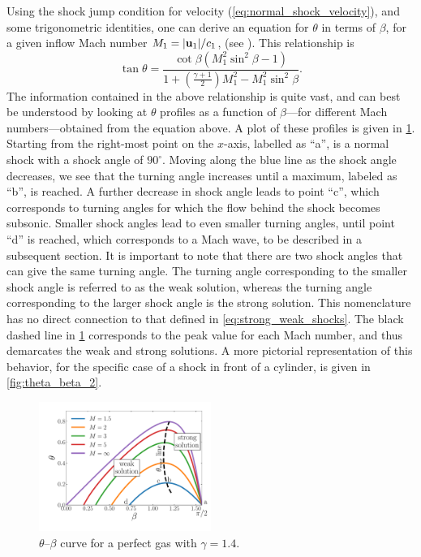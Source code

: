 \documentclass[oneside,a4paper,11pt]{report}
\begin{document}
Using the shock jump condition for velocity (\cref{eq:normal_shock_velocity}), and some trigonometric identities, one can derive an equation for $\theta$ in terms of $\beta$, for a given inflow Mach number $M_1 = |\mathbf{u}_1|/c_1$, (see \cite{thompson1988}). This relationship is
\begin{equation}
    \tan \theta =\dfrac{ \cot \beta \left ( M_1^2 \sin^2 \beta - 1 \right ) }{ 1 + \left ( \frac{\gamma + 1}{2} \right ) M_1^2 - M_1^2 \sin^2 \beta}.
\end{equation}
The information contained in the above relationship is quite vast, and can best be understood by looking at $\theta$ profiles as a function of $\beta$---for different Mach numbers---obtained from the equation above. A plot of these profiles is given in \cref{fig:theta_beta_1}. Starting from the right-most point on the $x$-axis, labelled as ``a'', is a normal shock with a shock angle of $90^\circ$. Moving along the blue line as the shock angle decreases, we see that the turning angle increases until a maximum, labeled as ``b'', is reached. A further decrease in shock angle leads to point ``c'', which corresponds to turning angles for which the flow behind the shock becomes subsonic. Smaller shock angles lead to even smaller turning angles, until point ``d'' is reached, which corresponds to a Mach wave, to be described in a subsequent section. It is important to note that there are two shock angles that can give the same turning angle. The turning angle corresponding to the smaller shock angle is referred to as the weak solution, whereas the turning angle corresponding to the larger shock angle is the strong solution. This nomenclature has no direct connection to that defined in \cref{eq:strong_weak_shocks}. The black dashed line in \cref{fig:theta_beta_1} corresponds to the peak value for each Mach number, and thus demarcates the weak and strong solutions. A more pictorial representation of this behavior, for the specific case of a shock in front of a cylinder, is given in \cref{fig:theta_beta_2}. 
\begin{figure}[ht]
   \centering
   \includegraphics[width=0.5\textwidth]{../../../images/theta_beta_1.pdf}
   \caption{$\theta$--$\beta$ curve for a perfect gas with $\gamma = 1.4$.}
   \label{fig:theta_beta_1}
\end{figure}
\end{document}
